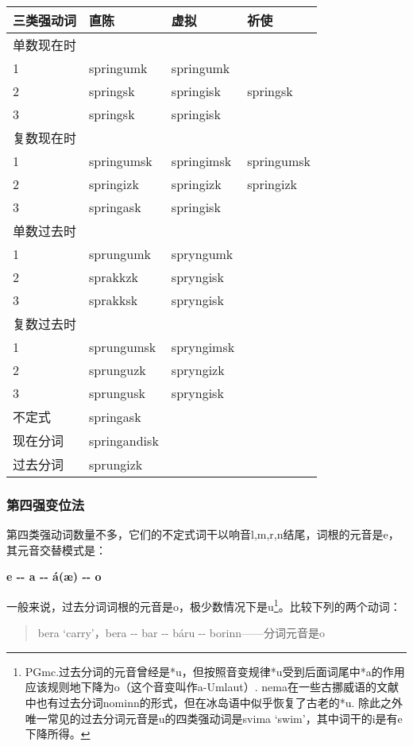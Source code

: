 \begin{longtable}{llll}
\toprule
三类强动词 & 直陈 & 虚拟 & 祈使 \\
\midrule
\endhead
\bottomrule
\endfoot
单数现在时 & & & \\
1 & springumk & springumk & \\
2 & springsk & springisk & springsk \\
3 & springsk & springisk & \\
复数现在时 & & & \\
1 & springumsk & springimsk & springumsk \\
2 & springizk & springizk & springizk \\
3 & springask & springisk & \\
单数过去时 & & & \\
1 & sprungumk & spryngumk & \\
2 & sprakkzk & spryngisk & \\
3 & sprakksk & spryngisk & \\
复数过去时 & & & \\
1 & sprungumsk & spryngimsk & \\
2 & sprunguzk & spryngizk & \\
3 & sprungusk & spryngisk & \\
不定式 & springask & & \\
现在分词 & springandisk & & \\
过去分词 & sprungizk & & \\
\end{longtable}

\subsubsection{第四强变位法}\label{ux7b2cux56dbux5f3aux53d8ux4f4dux6cd5}

第四类强动词数量不多，它们的不定式词干以响音l,m,r,n结尾，词根的元音是e，其元音交替模式是：

\textbf{e -\/- a -\/- á(æ) -\/- o}

一般来说，过去分词词根的元音是o，极少数情况下是u\footnote{PGmc.过去分词的元音曾经是*u，但按照音变规律*u受到后面词尾中*a的作用应该规则地下降为o（这个音变叫作a-Umlaut）.
  nema在一些古挪威语的文献中也有过去分词nominn的形式，但在冰岛语中似乎恢复了古老的*u.
  除此之外唯一常见的过去分词元音是u的四类强动词是svima
  `swim'，其中词干的i是有e下降所得。}。比较下列的两个动词：

\begin{quote}
bera `carry‌'，bera -\/- bar -\/- báru -\/- borinn------分词元音是o
\end{quote}

